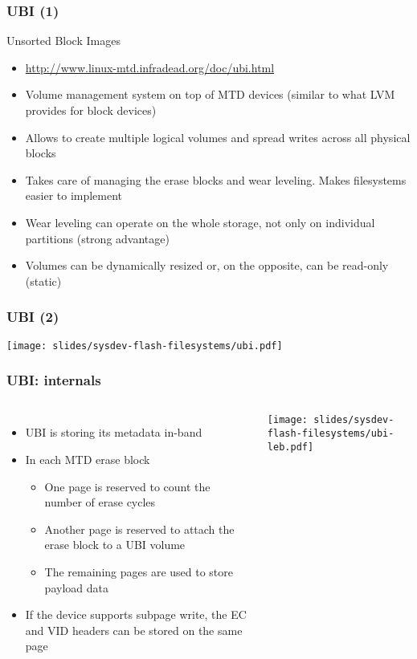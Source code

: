 \begin{frame}
  \frametitle{UBI (1)}
  Unsorted Block Images
  \begin{itemize}
  \item \url{http://www.linux-mtd.infradead.org/doc/ubi.html}
  \item Volume management system on top of MTD devices (similar to
    what LVM provides for block devices)
  \item Allows to create multiple logical volumes and spread writes
    across all physical blocks
  \item Takes care of managing the erase blocks and wear
    leveling. Makes filesystems easier to implement
  \item Wear leveling can operate on the whole storage,
    not only on individual partitions (strong advantage)
  \item Volumes can be dynamically resized or, on the opposite, can be
    read-only (static)
  \end{itemize}
\end{frame}

\begin{frame}
  \frametitle{UBI (2)}
  \begin{center}
    \texttt{[image: slides/sysdev-flash-filesystems/ubi.pdf]}
  \end{center}
\end{frame}

\begin{frame}
  \frametitle{UBI: internals}
  \begin{columns}
    \begin{itemize}
    \item UBI is storing its metadata in-band
    \item In each MTD erase block
    \begin{itemize}
      \item One page is reserved to count the number of erase cycles
      \item Another page is reserved to attach the erase block to a
        UBI volume
      \item The remaining pages are used to store payload data
      \end{itemize}
    \item If the device supports subpage write, the EC and VID headers
      can be stored on the same page
    \end{itemize}
    \texttt{[image: slides/sysdev-flash-filesystems/ubi-leb.pdf]}
  \end{columns}
\end{frame}

